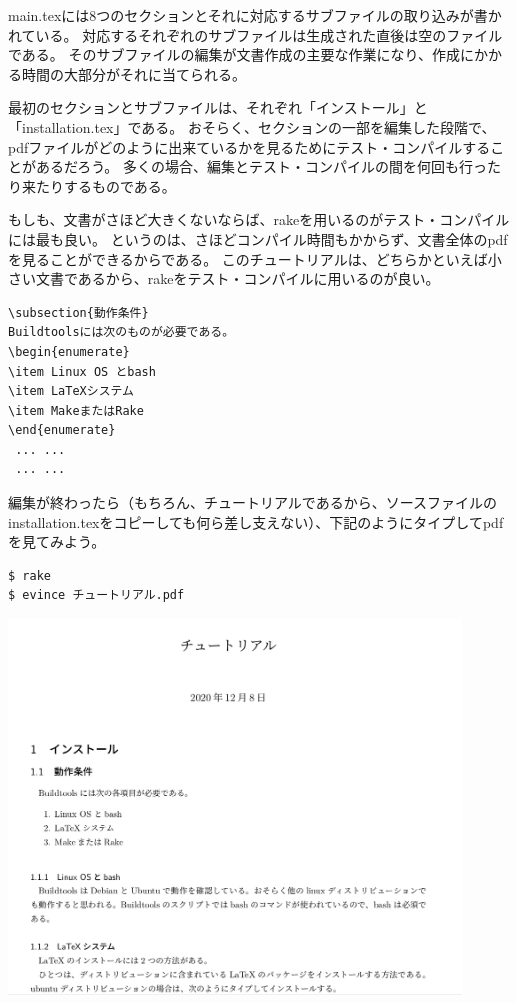 main.texには8つのセクションとそれに対応するサブファイルの取り込みが書かれている。
対応するそれぞれのサブファイルは生成された直後は空のファイルである。
そのサブファイルの編集が文書作成の主要な作業になり、作成にかかる時間の大部分がそれに当てられる。

最初のセクションとサブファイルは、それぞれ「インストール」と「installation.tex」である。
おそらく、セクションの一部を編集した段階で、pdfファイルがどのように出来ているかを見るためにテスト・コンパイルすることがあるだろう。
多くの場合、編集とテスト・コンパイルの間を何回も行ったり来たりするものである。

もしも、文書がさほど大きくないならば、rakeを用いるのがテスト・コンパイルには最も良い。
というのは、さほどコンパイル時間もかからず、文書全体のpdfを見ることができるからである。
このチュートリアルは、どちらかといえば小さい文書であるから、rakeをテスト・コンパイルに用いるのが良い。
\begin{verbatim}
\subsection{動作条件}
Buildtoolsには次のものが必要である。
\begin{enumerate}
\item Linux OS とbash
\item LaTeXシステム
\item MakeまたはRake
\end{enumerate}
 ... ...
 ... ...
\end{verbatim}
編集が終わったら（もちろん、チュートリアルであるから、ソースファイルのinstallation.texをコピーしても何ら差し支えない）、下記のようにタイプしてpdfを見てみよう。
\begin{verbatim}
$ rake
$ evince チュートリアル.pdf
\end{verbatim}

\begin{center}
\includegraphics[width=12cm]{Tutorial_2.png}
\end{center}
